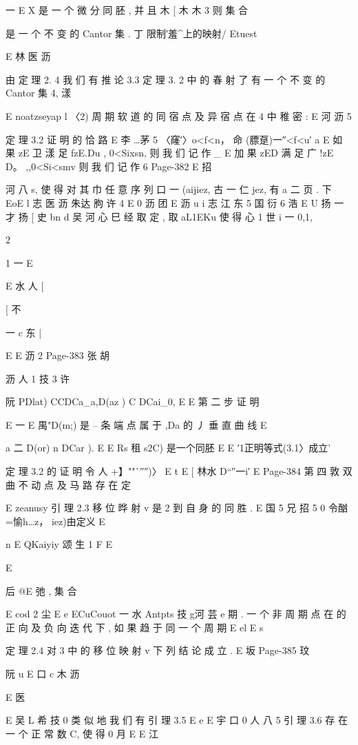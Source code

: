 {{{{{{{{{{{{{{{一 E X 是 一 个 微 分 同 胚 , 并 且
木
[ 木
木
3
则 集 合

是 一 个 不 变 的 Cantor 集 . 丁 限制′羞^上的映射/ Etuest

E 林
医 沥

由 定 理 2. 4 我 们 有
推 论 3.3 定 理 3. 2 中 的 春 射 了 有 一 个 不 变 的 Cantor 集 4, 漾

E
noatzseyap l
〈2) 周 期 软 道 的 同 宿 点 及 异 宿 点 在 4 中 稚 密 :
E 河 沥 5

定 理 3.2 证 明 的 恰 路
E 李
…茅 5 〈窿′〉o<f<n， 命 (膘趸)一″<f<u′
a E
如 果 zE 卫 漾 足 fzE.Du , 0<Sixsn, 则 我 们 记 作
_ E
加 果 zED 满 足 广 !zE D。 ,,0<Si<smv 则 我 们 记 作
6
Page-382
E 招

河 八
s, 使 得 对 其 巾 任 意 序 列 口 一 (aijiez, 古 一 仁 jez, 有 a 二 页 . 下
EoE l 志
医 沥 朱达 朐 许 4
E 0 沥 团 E 沥
u i 志 江 东 5 国 衍
6
浩
E
U 扬 一 才 扬
[ 史
bn d 吴 河
心 巳 经 取 定 , 取 aL1EKu 使 得 心 1 世 i 一 0,1,

2

1 一
E

E 水
人
[

[ 不

一
c 东 |

E
E 沥
2
Page-383
张 胡

沥 人 1 技
3 许

阮
PDlat) CCDCa_a,D(az ) C DCai_0,
E
E
第 二 步 证 明

E 一
E 禺"D(m;)
是 -- 条 端 点 属 于 ,Da 的 丿 垂 直 曲 线
E

a 二 D(or) n DCar ).
E
E Rs 租 s2C)
是一个同胚 E
E ′1正明等式(3.1〉成立'

定 理 3.2 的 证 明
令
人 +】""`″″)〉
E t
E
[
林水
D“″一i′ E
Page-384
第 四 敦 双 曲 不 动 点 及 马 路 存 在 定

E
zeanusy
引 理 2.3 移 位 晔 射 v 是 2 到 自 身 的 同 胜 .
E 国 5 兄 招 5
0
令酗=愉h…z， iez)由定义
E

n
E
QKaiyiy 颂 生 1
F
E

E

后 @E 弛 , 集 合

E cod 2 尘
E e
ECuCouot 一 水 Antpts 技 g河 芸 e
期 . 一 个 非 周 期 点 在 的 正 向 及 负 向 迭 代 下 , 如 果 趋 于 同 一 个 周 期
E el E
s

定 理 2.4 对 3 中 的 移 位 映 射 v 下 列 结 论 成 立 .
E 坂
Page-385
玟

阮
u
E 口
c 木
沥

E 医

E 吴 L 希 技
0
类 似 地 我 们 有
引 理 3.5 E
e
E 宇 口 0 人 八 5
引 理 3.6 存 在 一 个 正 常 数 C, 使 得
0 月
E
E 江

}}}}}}}}}}}}}}}
